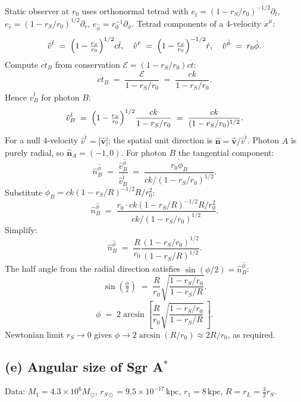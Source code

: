 \documentclass[11pt]{article}
\begin{document}
Static observer at $r_0$ uses orthonormal tetrad with $e_{\hat t}=(1-r_S/r_0)^{-1/2}\partial_t$, $e_{\hat r}=(1-r_S/r_0)^{1/2}\partial_r$, $e_{\hat\phi}=r_0^{-1}\partial_\phi$. Tetrad components of a 4-velocity $\dot x^\mu$:
\[
\hat v^{\hat t} \;=\; \Bigl(1-\tfrac{r_S}{r_0}\Bigr)^{1/2} c\dot t,\quad \hat v^{\hat r} \;=\; \Bigl(1-\tfrac{r_S}{r_0}\Bigr)^{-1/2}\dot r,\quad \hat v^{\hat\phi} \;=\; r_0\dot\phi.
\]
Compute $c\dot t_B$ from conservation $\mathcal E=(1-r_S/r_0)c\dot t$:
\[
c\dot t_B \;=\; \frac{\mathcal E}{1-r_S/r_0} \;=\; \frac{ck}{1-r_S/r_0}.
\]
Hence $\hat v^{\hat t}_B$ for photon $B$:
\[
\hat v^{\hat t}_B \;=\; \Bigl(1-\tfrac{r_S}{r_0}\Bigr)^{1/2}\frac{ck}{1-r_S/r_0} \;=\; \frac{ck}{(1-r_S/r_0)^{1/2}}.
\]
For a null 4-velocity $\hat v^{\hat t}=|\hat{\mathbf v}|$; the spatial unit direction is $\hat{\mathbf n}=\hat{\mathbf v}/\hat v^{\hat t}$. Photon $A$ is purely radial, so $\hat{\mathbf n}_A=(-1,0)$. For photon $B$ the tangential component:
\[
\hat n_B^{\hat\phi} \;=\; \frac{\hat v^{\hat\phi}_B}{\hat v^{\hat t}_B} \;=\; \frac{r_0\dot\phi_B}{ck/(1-r_S/r_0)^{1/2}}.
\]
Substitute $\dot\phi_B=ck(1-r_S/R)^{-1/2}R/r_0^2$:
\[
\hat n_B^{\hat\phi} \;=\; \frac{r_0\cdot ck(1-r_S/R)^{-1/2}R/r_0^2}{ck/(1-r_S/r_0)^{1/2}}.
\]
Simplify:
\[
\hat n_B^{\hat\phi} \;=\; \frac{R}{r_0}\frac{(1-r_S/r_0)^{1/2}}{(1-r_S/R)^{1/2}}.
\]
The half angle from the radial direction satisfies $\sin(\phi/2)=\hat n_B^{\hat\phi}$:
\[
\sin\!\left(\tfrac{\phi}{2}\right) \;=\; \frac{R}{r_0}\sqrt{\frac{1-r_S/r_0}{1-r_S/R}}.
\]
\begin{equation}
\boxed{\;\phi \;=\; 2\arcsin\!\left[\frac{R}{r_0}\sqrt{\frac{1-r_S/r_0}{1-r_S/R}}\,\right].\;}
\label{eq:phidiam}
\end{equation}
Newtonian limit $r_S\to 0$ gives $\phi\to 2\arcsin(R/r_0)\approx 2R/r_0$, as required.

\subsection*{(e) Angular size of Sgr A$^*$}

Data: $M_1=4.3\times 10^6 M_\odot$, $r_{S\odot}=9.5\times 10^{-17}\,\text{kpc}$, $r_1=8\,\text{kpc}$, $R=r_L=\tfrac32 r_S$.
\end{document}
